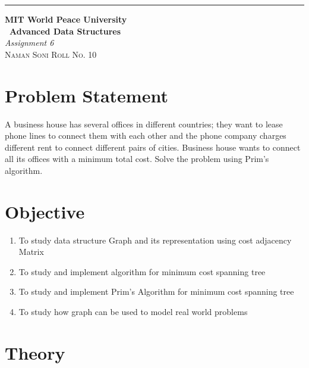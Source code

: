 \documentclass{article}
\begin{document}
\begin{titlepage} %
	
	\raggedleft\rule{1pt}{\textheight} %
	\hspace{0.05\textwidth} %
	\parbox[b]{0.75\textwidth}
	{ %
		
		{\Huge\bfseries MIT World Peace University \\[0.5\baselineskip] \ Advanced Data Structures}\\[2\baselineskip] %
		{\large\textit{Assignment 6}}\\[4\baselineskip] %
		{\Large\textsc{Naman Soni Roll No. 10}} %
		
		\vspace{0.5\textheight} %
	}
	
\end{titlepage}
\tableofcontents
\pagebreak
\section{\textbf{Problem Statement}}
A business house has several offices in different countries; they want to lease phone
lines to connect them with each other and the phone company charges different rent to
connect different pairs of cities. Business house wants to connect all its offices with a
minimum total cost. Solve the problem using Prim’s algorithm.
\section{\textbf{Objective}}
\begin{enumerate}
	\item To study data structure Graph and its representation using cost adjacency Matrix
	\item To study and implement algorithm for minimum cost spanning tree
	\item To study and implement Prim’s Algorithm for minimum cost spanning tree
	\item To study how graph can be used to model real world problems
\end{enumerate}
\section{\textbf{Theory}}
\end{document}
